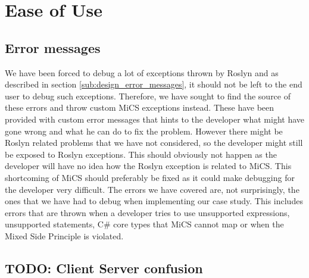 \section{Ease of Use} %
\label{sec:ease_of_use}
	\subsection{Error messages} %
	\label{sub:evaluation_of_error_messages}
		We have been forced to debug a lot of exceptions thrown by Roslyn and as described in section \ref{sub:design_error_messages}, it should not be left to the end user to debug such exceptions. Therefore, we have sought to find the source of these errors and throw custom MiCS exceptions instead. These have been provided with custom error messages that hints to the developer what might have gone wrong and what he can do to fix the problem. However there might be Roslyn related problems that we have not considered, so the developer might still be exposed to Roslyn exceptions. This should obviously not happen as the developer will have no idea how the Roslyn exception is related to MiCS. This shortcoming of MiCS should preferably be fixed as it could make debugging for the developer very difficult. The errors we have covered are, not surprisingly, the ones that we have had to debug when implementing our case study. This includes errors that are thrown when a developer tries to use unsupported expressions, unsupported statements, C\# core types that MiCS cannot map or when the Mixed Side Principle is violated.

	\subsection{TODO: Client Server confusion} %
	\label{sub:client_server_confusion}
	








